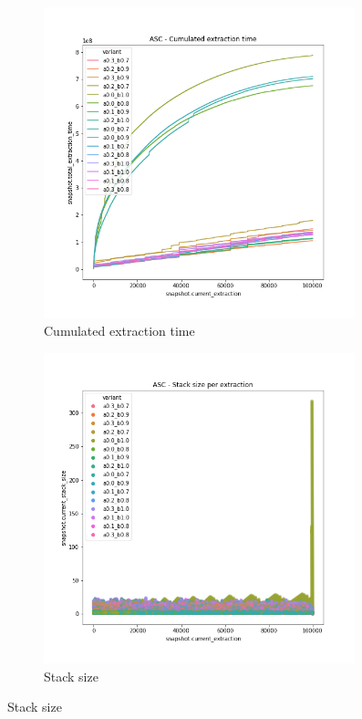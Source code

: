 \begin{figure}
    \centering
    \begin{subfigure}[b]{0.45\textwidth}
        \centering
        \includegraphics[width=0.99\textwidth]{./fragments/04_experimental_execution/images/04_alphabeta_detail_increasing.png.0_0.png}
        \caption{Cumulated extraction time}
        \label{FIG:05_ALPHABETA_BENCHMARK_ASC__0_0}
    \end{subfigure}
    \begin{subfigure}[b]{0.45\textwidth}
        \centering
        \includegraphics[width=0.99\textwidth]{./fragments/04_experimental_execution/images/04_alphabeta_detail_increasing.png.2_0.png}
        \caption{Stack size}
        \label{FIG:05_ALPHABETA_BENCHMARK_ASC__0_0}
    \end{subfigure}


\end{figure}
